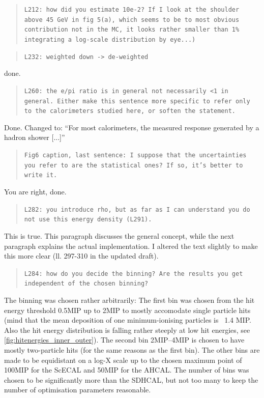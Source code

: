 \documentclass[twoside,a4paper,12pt]{article}
\begin{document}
\begin{quote}\texttt{L212: how did you estimate 10e-2? If I look at the shoulder above 45 GeV in fig 5(a), which seems to be to most 
obvious contribution not in the MC, it looks rather smaller than 1\% integrating a log-scale distribution by eye...)}\end{quote}
 

\begin{quote}\texttt{L232: weighted down -> de-weighted}\end{quote}
done.

\begin{quote}\texttt{L260: the e/pi ratio is in general not necessarily <1 in general. 
Either make this sentence more specific to refer only to the calorimeters studied here, or soften the statement.}\end{quote}
Done. Changed to: ``For most calorimeters, the measured response generated by a hadron shower [...]''


\begin{quote}\texttt{Fig6 caption, last sentence: I suppose that the uncertainties you refer to are the statistical ones?
If so, it's better to write it.}\end{quote}
You are right, done.

\begin{quote}\texttt{L282: you introduce rho, but as far as I can understand you do not use this energy density (L291).}\end{quote}
This is true. This paragraph discusses the general concept, while the next paragraph explains the actual implementation. I altered the text slightly to make this more clear  (ll. 297-310 in the updated draft).

\begin{quote}\texttt{L284: how do you decide the binning? Are the results you get independent of the chosen binning?}\end{quote}
The binning was chosen rather arbitrarily: The first bin was chosen from the hit energy threshold 0.5MIP up to 2MIP to mostly accomodate single particle hits (mind that the mean deposition of one minimum-ionising particles is ~1.4 MIP. Also the hit energy distribution is falling rather steeply at low hit energies, see \autoref{fig:hitenergies_inner_outer}). The second bin 2MIP--4MIP is chosen to have mostly two-particle hits (for the same reasons as the first bin). The other bins are made to be equidistant on a log-X scale up to the chosen maximum point of 100MIP for the ScECAL and 50MIP for the AHCAL. The number of bins was chosen to be significantly more than the SDHCAL, but not too many to keep the number of optimisation parameters reasonable. 
\end{document}
